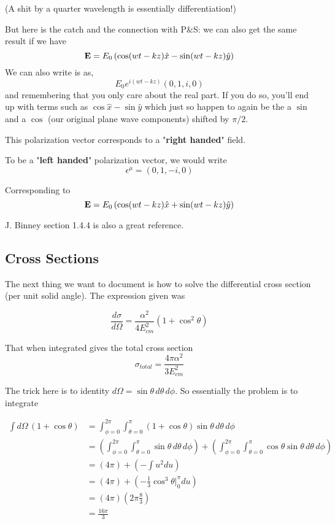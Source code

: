 (A shit by a quarter wavelength is essentially differentiation!)

But here is the catch and the connection with P\&S: we can also get the same result if we have
$$
\boldsymbol{\mathbf{E}} = E_0 \left( \cos(wt-kz)\hat{x} - \sin(wt-kz)\hat{y} \right)
$$
We can also write is as,
$$
E_0 e^{i(wt - kz)} (0, 1, i, 0)
$$
and remembering that you only care about the real part.
If you do so, you'll end up with terms such as $\cos \hat{x} - \sin \hat{y}$ which just so happen to again be the
a $\sin$ and a $\cos$ (our original plane wave components) shifted by $\pi/2$.

This polarization vector corresponds to a "\textbf{right handed}" field.

To be a "\textbf{left handed}" polarization vector, we would write
$$
\epsilon^\mu = (0, 1, -i, 0)
$$

Corresponding to
$$
\boldsymbol{\mathbf{E}} = E_0 \left( \cos(wt-kz)\hat{x} + \sin(wt-kz)\hat{y} \right)
$$

J. Binney section 1.4.4 is also a great reference.


\subsection{Cross Sections}

The next thing we want to document is how to solve the differential cross section (per unit solid angle).
The expression given was

$$
\frac{d\sigma}{d\Omega} = \frac{\alpha^2}{4E_{cm}^{2}} (1 + \cos^2 \theta)
$$

That when integrated gives the total cross section
$$
\sigma_{total} = \frac{4\pi\alpha^2}{3E_{cm}^{2}}
$$

The trick here is to identity $d\Omega = \sin\theta \, d\theta \, d\phi$.
So essentially the problem is to integrate

\begin{align*}
\int d\Omega \, \left( 1 + \cos\theta \right) &=
    \int_{\phi=0}^{2\pi} \int_{\theta=0}^{\pi} \left( 1 + \cos\theta \right) \sin\theta \, d\theta \, d\phi \\
&= \left( \int_{\phi=0}^{2\pi} \int_{\theta=0}^{\pi} \sin\theta \, d\theta \, d\phi \right)
    + \left( \int_{\phi=0}^{2\pi} \int_{\theta=0}^{\pi} \cos\theta \sin\theta \, d\theta \, d\phi \right) \\
&= \left( 4\pi \right) + \left( -\int u^2 du \right) \\
&= \left( 4\pi \right) + \left( -\frac{1}{3} \cos^3 \theta \Big|_{0}^{\pi} du \right) \\
&= \left( 4\pi \right) \left( 2\pi \frac{8}{3} \right) \\
&= \frac{16\pi}{3}
\end{align*}

